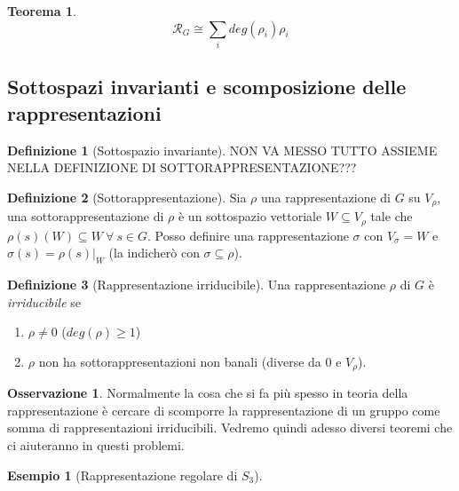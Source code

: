 \documentclass[11pt]{article}
\theoremstyle{plain}
\newtheorem{thm}{Teorema}[section]
\theoremstyle{definition}
\newtheorem{defn}{Definizione}[section]
\newtheorem{exmp}{Esempio}[section]
\newtheorem*{rem}{Osservazione}
\theoremstyle{remark}
\newcommand{\dsum}{\displaystyle\sum}
\begin{document}
\begin{thm}

\[\mathcal{R}_G \cong \dsum_i deg(\rho_i) \rho_i \]

\end{thm}



\subsection{Sottospazi invarianti e scomposizione delle rappresentazioni}


\begin{defn}[Sottospazio invariante]
NON VA MESSO TUTTO ASSIEME NELLA DEFINIZIONE DI SOTTORAPPRESENTAZIONE???

\end{defn}

\begin{defn}[Sottorappresentazione]
Sia $\rho$ una rappresentazione di $G$ su $V_{\rho}$, una sottorappresentazione di $\rho$ è un sottospazio vettoriale $W\subseteq V_{\rho}$ tale che $\rho(s)(W)\subseteq W\ \forall\ s\in G$. Posso definire una rappresentazione $\sigma$ con $V_{\sigma}=W$ e $\sigma(s)=\rho(s)|_W$ (la indicherò con $\sigma\subseteq \rho$).
\end{defn}



\begin{defn}[Rappresentazione irriducibile]
Una rappresentazione $\rho$ di $G$ è \textit{irriducibile} se
\begin{enumerate}
	\item $\rho \neq 0$ ($deg(\rho) \geq 1$)
	\item $\rho$ non ha sottorappresentazioni non banali (diverse da 0 e $V_{\rho}$).
\end{enumerate}

\end{defn}

\begin{rem} Normalmente la cosa che si fa più spesso in teoria della rappresentazione è cercare di scomporre la rappresentazione di un gruppo come somma di rappresentazioni irriducibili. Vedremo quindi adesso diversi teoremi che ci aiuteranno in questi problemi.

\end{rem}



\begin{exmp}[Rappresentazione regolare di $S_3$]


\end{exmp}
\end{document}
